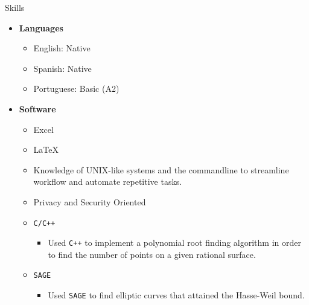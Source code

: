 \documentclass{resume} %
\begin{document}
\begin{rSection}{Skills}
    \begin{itemize}
        \item \textbf{Languages}
            \begin{itemize}
                \item English: Native

                \item Spanish: Native

                \item Portuguese: Basic (A2)
            \end{itemize}

        \item \textbf{Software}
            \begin{itemize}
                \item Excel

                \item \LaTeX

                \item Knowledge of UNIX-like systems and the commandline to
                    streamline workflow and automate repetitive tasks.

                \item Privacy and Security Oriented

                \item \lstinline{C/C++}
                    \begin{itemize}
                        \item[\circ] Used \lstinline{C++} to implement a
                            polynomial root finding algorithm in order to find
                            the number of points on a given rational surface.
                    \end{itemize}

                \item \lstinline{SAGE}
                    \begin{itemize}
                        \item[\circ] Used \lstinline{SAGE} to find elliptic
                            curves that attained the Hasse-Weil bound.
                    \end{itemize}
            \end{itemize}
    \end{itemize}
\end{rSection}
\end{document}
